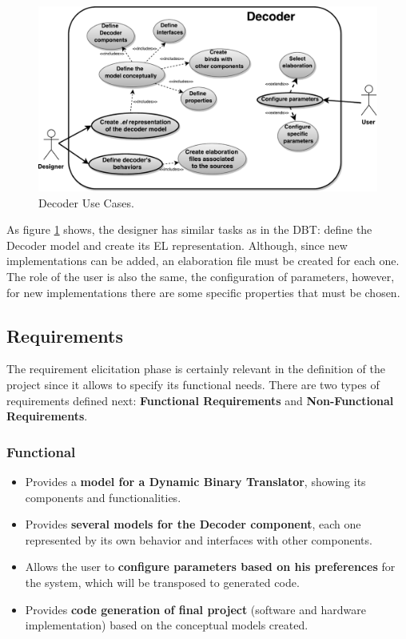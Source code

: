 \documentclass[12pt]{article}
\begin{document}
{\begin{figure}[!htb]
\centerline{
\includegraphics[scale=0.65]{images/Decoder_UseCases.pdf} }
\caption{Decoder Use Cases.}
\label{fig:DecoderUseCases} 
\end{figure}

As figure \ref{fig:DecoderUseCases} shows, the designer has similar tasks as in the DBT: define the Decoder model and create its EL representation. Although, since new implementations can be added, an elaboration file must be created for each one. The role of the user is also the same, the configuration of parameters, however, for new implementations there are some specific properties that must be chosen.


\subsection{Requirements}
The requirement elicitation phase is certainly relevant in the definition of the project since it allows to specify its functional needs. There are two types of requirements defined next: \textbf{Functional Requirements} and \textbf{Non-Functional Requirements}. 

\subsubsection{Functional}
\begin{itemize}
\item Provides a \textbf{model for a Dynamic Binary Translator}, showing its components and functionalities.
\item Provides \textbf{several models for the Decoder component}, each one represented by its own behavior and interfaces with other components. 
\item Allows the user to \textbf{configure parameters based on his preferences} for the system, which will be transposed to generated code.
\item Provides\textbf{ code generation of final project} (software and hardware implementation) based on the conceptual models created.
\end{itemize}

}
\end{document}

